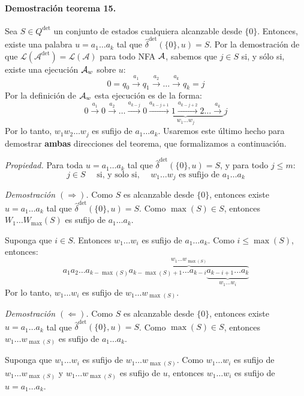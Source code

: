 \paragraph{Demostración teorema 15.} Sea $S \in Q^\text{det}$ un conjunto de estados cualquiera alcanzable desde $\{0\}$. Entonces, existe una palabra $u = a_1 \ldots a_k$ tal que $\hat{\delta}^{\operatorname{det}}(\{0\}, u)=S$. Por la demostración de que $\mathcal{L}\left(\mathcal{A}^{\mathrm{det}}\right)=\mathcal{L}(\mathcal{A})$ para todo NFA $\mathcal{A}$, sabemos que $j \in S$ si, y sólo si, existe una ejecución $\mathcal{A}_w$ sobre $u$:
$$
    0=q_0 \stackrel{a_1}{\rightarrow} q_1 \stackrel{a_2}{\rightarrow} \ldots \stackrel{a_k}{\rightarrow} q_k=j
$$
Por la definición de $\mathcal{A}_w$ esta ejecución es de la forma:
$$
    0 \stackrel{a_1}{\rightarrow} 0 \stackrel{a_2}{\rightarrow} \ldots \stackrel{a_{k-j}}{\rightarrow} 0 \underbrace{\stackrel{a_{k-j+1}}{\rightarrow} 1 \stackrel{a_{k-j+2}}{\rightarrow} 2 \ldots \stackrel{a_k}{\rightarrow}}_{w_1 \ldots w_j} j
$$
Por lo tanto, $w_1 w_2 \ldots w_j$ es sufijo de $a_1 \ldots a_k$. Usaremos este último hecho para demostrar \textbf{ambas} direcciones del teorema, que formalizamos a continuación. \medbreak

\textit{Propiedad.} Para toda $u = a_1\ldots a_k$ tal que $\hat{\delta}^{\operatorname{det}}(\{0\}, u)=S$, y para todo $j \leq m$:
$$
    j \in S \quad \text { si, y solo si, } \quad w_1 \ldots w_j \text { es sufijo de } a_1 \ldots a_k
$$

\textit{Demostración $(\Rightarrow)$.} Como $S$ es alcanzable desde $\{0\}$, entonces existe $u = a_1 \ldots a_k$ tal que $\hat{\delta}^{\operatorname{det}}(\{0\}, u)=S$. Como $\max(S) \in S$, entonces $W_1 \ldots W_{\max }(S)$ es sufijo de $a_1 \ldots a_k$. \medbreak

Suponga que $i \in S$. Entonces $w_1 \ldots w_i$ es sufijo de $a_1 \ldots a_k$. Como $i \leq \max(S)$, entonces:
$$
    a_1 a_2 \ldots a_{k-\max(S)} \overbrace{a_{k-\max(S)+1} \ldots a_{k-i} \underbrace{a_{k-i+1}\ldots a_k}_{w_1\ldots w_i}}^{w_1\ldots w_{\max(S)}}
$$
Por lo tanto, $w_1 \ldots w_i$ es sufijo de $w_1 \ldots w_{\max(S)}$. \medbreak

\textit{Demostración $(\Leftarrow)$.} Como $S$ es alcanzable desde $\{0\}$, entonces existe $u = a_1 \ldots a_k$ tal que $\hat{\delta}^{\mathrm{det}}(\{0\}, u)=S$. Como $\max(S) \in S$, entonces $w_1 \ldots w_{\max(S)}$ es sufijo de $a_1 \ldots a_k$. \medbreak

Suponga que $w_1 \ldots w_i$ es sufijo de $w_1 \ldots w_{\max(S)}$. Como $w_1 \ldots w_i$ es sufijo de $w_1 \ldots w_{\max(S)}$ y $w_1 \ldots w_{\max(S)}$ es sufijo de $u$, entonces $w_1 \ldots w_i$ es sufijo de $u = a_1 \ldots a_k$. \medbreak

